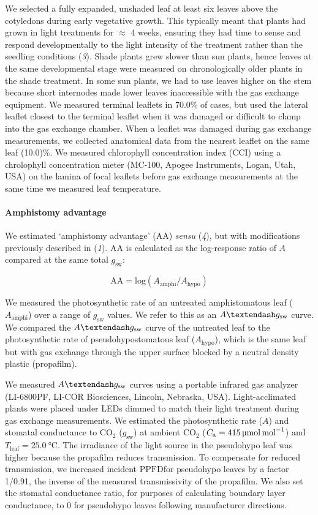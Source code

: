 \documentclass[
  letterpaper,
  DIV=11,
  numbers=noendperiod]{scrartcl}
\let\oldparagraph\paragraph
\renewcommand{\paragraph}[1]{\oldparagraph{#1}\mbox{}}
\newcommand{\aax}{$\mathrm{AA}$}
\newcommand{\Aamphi}{$A_{\mathrm{amphi}}$}
\newcommand{\Ahypo}{$A_{\mathrm{hypo}}$}
\newcommand{\agcurve}{$A \textendash g_\text{sw}$}
\newcommand{\caequals}[1]{$C_\mathrm{a} = \qty{#1}{\micro\mol\raiseto{-1}\mol}$}
\newcommand{\gsw}{$g_\text{sw}$}
\newcommand{\ppfd}{$\mathrm{PPFD}$}
\newcommand{\tleafequals}[1]{$T_\mathrm{leaf} = \qty{#1}{\degreeCelsius}$}
\begin{document}
We selected a fully expanded, unshaded leaf at least six leaves above
the cotyledons during early vegetative growth. This typically meant that
plants had grown in light treatments for \(\approx\) 4 weeks, ensuring
they had time to sense and respond developmentally to the light
intensity of the treatment rather than the seedling conditions
(\emph{3}). Shade plants grew slower than sun plants, hence leaves at
the same developmental stage were measured on chronologically older
plants in the shade treatment. In some sun plants, we had to use leaves
higher on the stem because short internodes made lower leaves
inaccessible with the gas exchange equipment. We measured terminal
leaflets in 70.0\% of cases, but used the lateral leaflet closest to the
terminal leaflet when it was damaged or difficult to clamp into the gas
exchange chamber. When a leaflet was damaged during gas exchange
measurements, we collected anatomical data from the nearest leaflet on
the same leaf (10.0)\%. We measured chlorophyll concentration index
(CCI) using a chrolophyll concentration meter (MC-100, Apogee
Instruments, Logan, Utah, USA) on the lamina of focal leaflets before
gas exchange measurements at the same time we measured leaf temperature.

\paragraph{Amphistomy advantage}\label{amphistomy-advantage}

We estimated `amphistomy advantage' (\aax) \emph{sensu} (\emph{4}), but
with modifications previously described in (\emph{1}). \aax{} is
calculated as the log-response ratio of \(A\) compared at the same total
\gsw:

\[\mathrm{AA} = \mathrm{log}(A_{\mathrm{amphi}} / A_{\mathrm{hypo}})\]

We measured the photosynthetic rate of an untreated amphistomatous leaf
(\Aamphi) over a range of \gsw{} values. We refer to this as an
\agcurve{} curve. We compared the \agcurve{} curve of the untreated leaf
to the photosynthetic rate of pseudohypostomatous leaf (\Ahypo), which
is the same leaf but with gas exchange through the upper surface blocked
by a neutral density plastic (propafilm).

We measured \agcurve{} curves using a portable infrared gas analyzer
(LI-6800PF, LI-COR Biosciences, Lincoln, Nebraska, USA).
Light-acclimated plants were placed under LEDs dimmed to match their
light treatment during gas exchange measurements. We estimated the
photosynthetic rate (\(A\)) and stomatal conductance to CO\(_2\) (\gsw)
at ambient CO\(_2\) (\caequals{415}) and \tleafequals{25.0}. The
irradiance of the light source in the pseudohypo leaf was higher because
the propafilm reduces transmission. To compensate for reduced
transmission, we increased incident \ppfd for pseudohypo leaves by a
factor 1/0.91, the inverse of the measured transmissivity of the
propafilm. We also set the stomatal conductance ratio, for purposes of
calculating boundary layer conductance, to 0 for pseudohypo leaves
following manufacturer directions.
\end{document}
